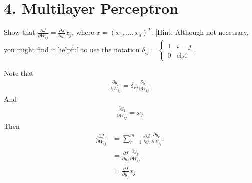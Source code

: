 \documentclass[12pt,letterpaper]{article}
\begin{document}
\newenvironment{solution}[2][Solution]{\begin{trivlist}
\item[\hskip \labelsep {\bfseries #1}]}{\end{trivlist}}
\newenvironment{problem}[2][Problem]{\begin{trivlist}
\item[\hskip \labelsep {\bfseries #1}\hskip \labelsep {\bfseries #2.}]}{\end{trivlist}}


\section*{4. Multilayer Perceptron}

\begin{problem}{4.1.1.1}
    Show that $\frac{\partial J}{\partial W_{ij}}=\frac{\partial J}{\partial y_{i}}x_{j}$,
    where $x=\left(x_{1},\ldots,x_{d}\right)^{T}$. {[}Hint: Although
    not necessary, you might find it helpful to use the notation $\delta_{ij}=\begin{cases}
    1 & i=j\\
    0 & \text{else}
    \end{cases}$. 
\end{problem}
\begin{solution}{}
    Note that 
    \begin{align*}
        \frac{\partial y_{r}}{\partial W_{ij}} = \delta_{rj}\frac{\partial y_{r}}{\partial W_{ij}}
    \end{align*}
    And
    \begin{align*}
        \frac{\partial y_{j}}{\partial W_{ij}} = x_j
    \end{align*}
    Then
    \begin{align*}
        \frac{\partial J}{\partial W_{ij}}&=\sum_{r=1}^{m}\frac{\partial J}{\partial y_{r}}\frac{\partial y_{r}}{\partial W_{ij}}.\\
        &= \frac{\partial J}{\partial y_{j}}\frac{\partial y_{j}}{\partial W_{ij}}\\
        &= \frac{\partial J}{\partial y_{j}}x_j
    \end{align*}
\end{solution}
\newpage
\end{document}
